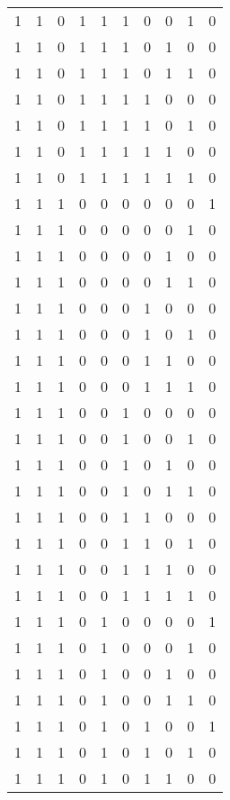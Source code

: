 \begin{longtable}[c]{rrrrrrrrrr}
        1 & 1 & 0 & 1 & 1 & 1 & 0 & 0 & 1 & 0 \\
        1 & 1 & 0 & 1 & 1 & 1 & 0 & 1 & 0 & 0 \\
        1 & 1 & 0 & 1 & 1 & 1 & 0 & 1 & 1 & 0 \\
        1 & 1 & 0 & 1 & 1 & 1 & 1 & 0 & 0 & 0 \\
        1 & 1 & 0 & 1 & 1 & 1 & 1 & 0 & 1 & 0 \\
        1 & 1 & 0 & 1 & 1 & 1 & 1 & 1 & 0 & 0 \\
        1 & 1 & 0 & 1 & 1 & 1 & 1 & 1 & 1 & 0 \\
        1 & 1 & 1 & 0 & 0 & 0 & 0 & 0 & 0 & 1 \\
        1 & 1 & 1 & 0 & 0 & 0 & 0 & 0 & 1 & 0 \\
        1 & 1 & 1 & 0 & 0 & 0 & 0 & 1 & 0 & 0 \\
        1 & 1 & 1 & 0 & 0 & 0 & 0 & 1 & 1 & 0 \\
        1 & 1 & 1 & 0 & 0 & 0 & 1 & 0 & 0 & 0 \\
        1 & 1 & 1 & 0 & 0 & 0 & 1 & 0 & 1 & 0 \\
        1 & 1 & 1 & 0 & 0 & 0 & 1 & 1 & 0 & 0 \\
        1 & 1 & 1 & 0 & 0 & 0 & 1 & 1 & 1 & 0 \\
        1 & 1 & 1 & 0 & 0 & 1 & 0 & 0 & 0 & 0 \\
        1 & 1 & 1 & 0 & 0 & 1 & 0 & 0 & 1 & 0 \\
        1 & 1 & 1 & 0 & 0 & 1 & 0 & 1 & 0 & 0 \\
        1 & 1 & 1 & 0 & 0 & 1 & 0 & 1 & 1 & 0 \\
        1 & 1 & 1 & 0 & 0 & 1 & 1 & 0 & 0 & 0 \\
        1 & 1 & 1 & 0 & 0 & 1 & 1 & 0 & 1 & 0 \\
        1 & 1 & 1 & 0 & 0 & 1 & 1 & 1 & 0 & 0 \\
        1 & 1 & 1 & 0 & 0 & 1 & 1 & 1 & 1 & 0 \\
        1 & 1 & 1 & 0 & 1 & 0 & 0 & 0 & 0 & 1 \\
        1 & 1 & 1 & 0 & 1 & 0 & 0 & 0 & 1 & 0 \\
        1 & 1 & 1 & 0 & 1 & 0 & 0 & 1 & 0 & 0 \\
        1 & 1 & 1 & 0 & 1 & 0 & 0 & 1 & 1 & 0 \\
        1 & 1 & 1 & 0 & 1 & 0 & 1 & 0 & 0 & 1 \\
        1 & 1 & 1 & 0 & 1 & 0 & 1 & 0 & 1 & 0 \\
        1 & 1 & 1 & 0 & 1 & 0 & 1 & 1 & 0 & 0 \\

\end{longtable}
